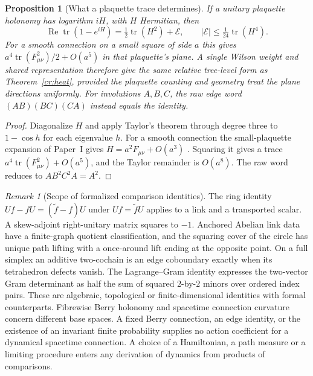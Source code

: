 \documentclass[aps,pra,onecolumn,superscriptaddress,nofootinbib,10pt]{revtex4-2}
\newtheorem{proposition}[theorem]{Proposition}
\theoremstyle{definition}
\theoremstyle{remark}
\newtheorem{remark}[theorem]{Remark}
\begin{document}
\begin{proposition}[What a plaquette trace determines]\label{cr:plaquette}
If a unitary plaquette holonomy has logarithm $iH$, with $H$
Hermitian, then
\[
 \operatorname{Re}\operatorname{tr}(1-e^{iH})
 =\tfrac12\operatorname{tr}(H^2)+\mathcal E,\qquad
 |\mathcal E|\le \tfrac1{24}\operatorname{tr}(H^4).
\]
For a smooth connection on a small square of side $a$ this gives
$a^4\operatorname{tr}(F_{\mu\nu}^2)/2+O(a^5)$ in that
plaquette's plane. A single Wilson weight and shared representation
therefore give the same relative tree-level form as
Theorem~\ref{cr:heat}, provided the plaquette counting and geometry
treat the plane directions uniformly. For involutions $A,B,C$,
the raw edge word $(AB)(BC)(CA)$ instead equals the identity.
\end{proposition}
\begin{proof}
Diagonalize $H$ and apply Taylor's theorem through degree three
to $1-\cos h$ for each eigenvalue $h$. For a smooth connection the
small-plaquette expansion of Paper~I gives
$H=a^2 F_{\mu\nu}+O(a^3)$ \cite[Prop.~9.8]{PaperI}. Squaring it gives a trace
$a^4\operatorname{tr}(F_{\mu\nu}^2)+O(a^5)$, and the Taylor
remainder is $O(a^8)$. The raw word reduces to $AB^2C^2A=A^2$.
\end{proof}

\begin{remark}[Scope of formalized comparison identities]\label{cr:formal}
The ring identity $Uf-fU=(\widetilde f-f)U$ under
$Uf=\widetilde f U$ applies to a link and a transported scalar.
A skew-adjoint right-unitary matrix squares to $-1$.
Anchored Abelian link data have a finite-graph quotient
classification, and the squaring cover of the circle has unique
path lifting with a once-around lift ending at the opposite
point. On a full simplex an additive two-cochain is an edge
coboundary exactly when its tetrahedron defects vanish.
The Lagrange--Gram identity expresses the two-vector Gram
determinant as half the sum of squared $2$-by-$2$ minors over
ordered index pairs.
These are algebraic, topological or finite-dimensional identities
with formal counterparts. Fibrewise Berry holonomy and
spacetime connection curvature concern different base spaces.
A fixed Berry connection, an edge identity, or the existence
of an invariant finite probability supplies no action coefficient
for a dynamical spacetime connection. A choice of a Hamiltonian,
a path measure or a limiting procedure enters any derivation
of dynamics from products of comparisons.
\end{remark}
\end{document}

